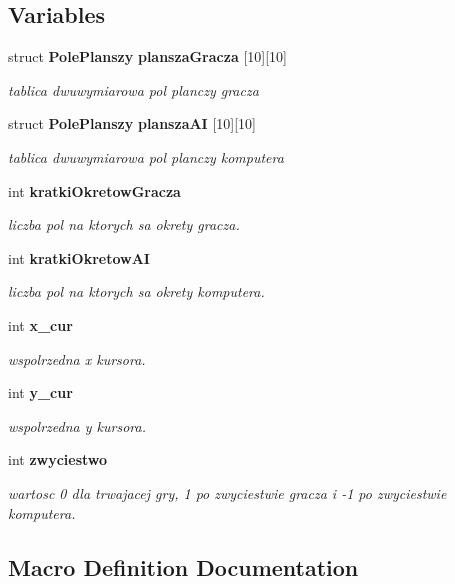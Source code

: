 \subsection*{Variables}
\begin{DoxyCompactItemize}
\item 
struct \textbf{ Pole\+Planszy} \textbf{ plansza\+Gracza} [10][10]
\begin{DoxyCompactList}\small\item\em tablica dwuwymiarowa pol planczy gracza \end{DoxyCompactList}\item 
struct \textbf{ Pole\+Planszy} \textbf{ plansza\+AI} [10][10]
\begin{DoxyCompactList}\small\item\em tablica dwuwymiarowa pol planczy komputera \end{DoxyCompactList}\item 
int \textbf{ kratki\+Okretow\+Gracza}
\begin{DoxyCompactList}\small\item\em liczba pol na ktorych sa okrety gracza. \end{DoxyCompactList}\item 
int \textbf{ kratki\+Okretow\+AI}
\begin{DoxyCompactList}\small\item\em liczba pol na ktorych sa okrety komputera. \end{DoxyCompactList}\item 
int \textbf{ x\+\_\+cur}
\begin{DoxyCompactList}\small\item\em wspolrzedna x kursora. \end{DoxyCompactList}\item 
int \textbf{ y\+\_\+cur}
\begin{DoxyCompactList}\small\item\em wspolrzedna y kursora. \end{DoxyCompactList}\item 
int \textbf{ zwyciestwo}
\begin{DoxyCompactList}\small\item\em wartosc 0 dla trwajacej gry, 1 po zwyciestwie gracza i -\/1 po zwyciestwie komputera. \end{DoxyCompactList}\end{DoxyCompactItemize}


\subsection{Macro Definition Documentation}
\mbox{\label{znaki_8c_ad72dbcf6d0153db1b8d8a58001feed83}} 
